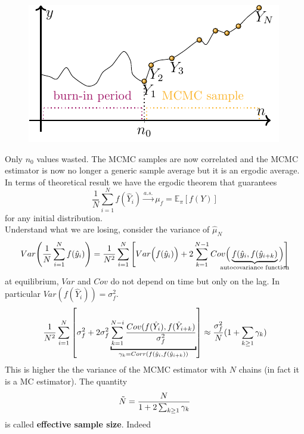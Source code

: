 \documentclass{article}
\begin{document}
\begin{figure}[H]
    \centering
    \includegraphics{standalones/pdfs/burnin}
\label{burnin}
\end{figure}
Only $n_0$ values wasted. %
The MCMC samples are now correlated and the MCMC estimator is now no longer a generic sample average but it is an ergodic average. In terms of theoretical result we have the ergodic theorem that guarantees 
\begin{equation*}
    \frac{1}{N}\sum_{i=1}^N f(\hat{Y}_i) \xrightarrow{a.s.} \mu_f = \mathbb{E}_{\pi}[f(Y)]
\end{equation*}
for any initial distribution.\\ Understand what we are losing, consider the variance of $\hat{\mu}_N$ 
\begin{equation*}
    Var\Bigg(\frac{1}{N}\sum_{i=1}^N f(\hat{y}_i)\Bigg) = \frac{1}{N^2}\sum_{i=1}^N\Bigg[Var\Big(f(\hat{y}_i)\Big)+2\sum_{k=1}^{N-1}Cov\Big(\underbrace{f(\hat{y}_i,f(\hat{y}_{i+k})}_{\mathclap{\text{autocovariance function}}}\Big)\Bigg]
\end{equation*}
at equilibrium, $Var$ and $Cov$ do not depend on time but only on the lag.  In particular $Var(f(\hat{Y}_i))= \sigma_f^2$. 
\begin{equation*}
    \frac{1}{N^2}  \sum_{i=1}^N \left[\sigma_f^2 + 2 \sigma_f^2\underbracket{\sum_{k=1}^{N-i}\frac{Cov(f(\hat{Y}_i),f(\hat{Y}_{i+k} )}{\sigma_f^2}}_{\mathclap{\gamma_k=Corr\left(f(\hat{y}_i,f(\hat{y}_{i+k})\right)}}\right] \approx \frac{\sigma_f^2}{N}(1+\sum_{k\geq 1}\gamma_k)
\end{equation*}
This is higher the the variance of the MCMC estimator with $N$ chains (in fact it is a MC estimator). The quantity 
\begin{equation*}
    \Tilde{N} = \frac{N}{1 +2\sum_{k\geq 1}\gamma_k }
\end{equation*}
is called \textbf{effective sample size}. Indeed
\end{document}
